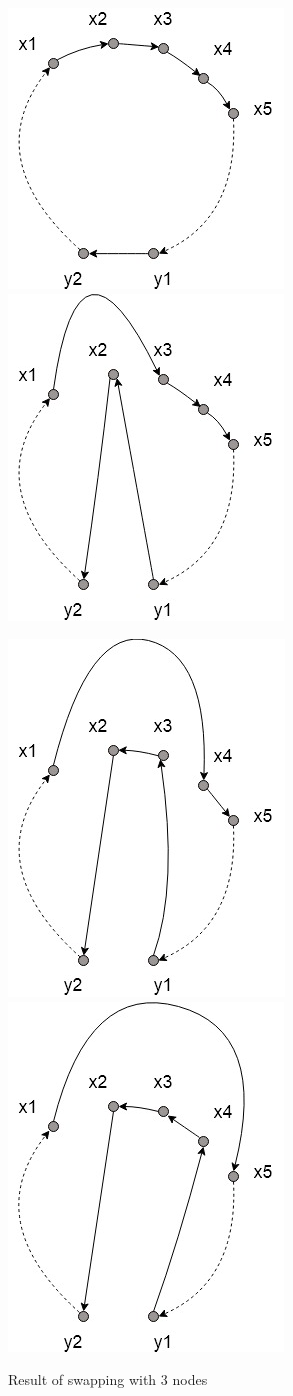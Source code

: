 \documentclass[11pt,a4paper,oneside]{book}
\begin{document}
\begin{multicols}{2}
\begin{figure}[ht!]
\includegraphics[width=.3\textwidth]{two-half/two-half.jpg}\hfill
\includegraphics[width=.3\textwidth]{two-half/two-half-1.jpg}\hfill

\includegraphics[width=.3\textwidth]{two-half/two-half-2.jpg}\hfill
\includegraphics[width=.3\textwidth]{two-half/two-half-3.jpg}
\caption{Initial tour} \label{fig:twohalf}
\caption{Result of swapping with 1 node} \label{fig:twohalf1}
\caption{Result of swapping with 2 nodes} \label{fig:twohalf2}
\caption{Result of swapping with 3 nodes} \label{fig:twohalf3}
\end{figure}
\end{multicols}
\end{document}
